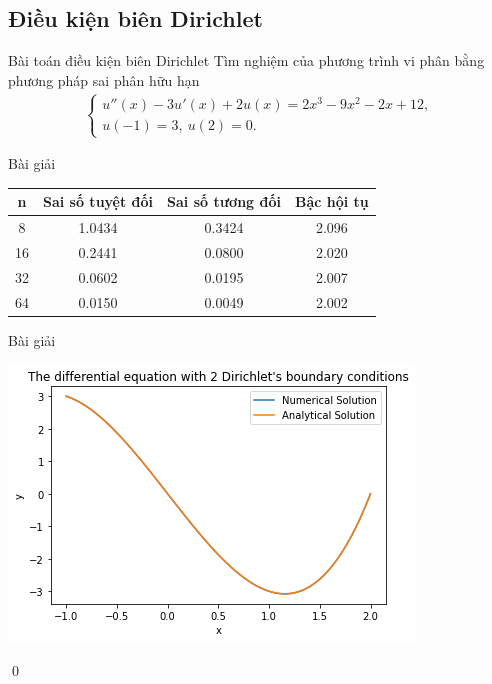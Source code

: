 \documentclass[9pt]{beamer}
\numberwithin{equation}{section}
\begin{document}
\subsection{Điều kiện biên Dirichlet}

\begin{frame}
\begin{block}{Bài toán điều kiện biên Dirichlet}
    Tìm nghiệm của phương trình vi phân bằng phương pháp sai phân hữu hạn
    \begin{align*}
    \begin{cases}
        u''(x) - 3u'(x) + 2u(x) = 2x^3 - 9x^2 - 2x + 12, \\
        u(-1) = 3, \ u(2) = 0.
    \end{cases}
    \end{align*}
\end{block}
    
\begin{exampleblock}{Bài giải}
    \begin{center}\begin{tabular}{||c|c|c|c||}
    \hline
    n & Sai số tuyệt đối & Sai số tương đối & Bậc hội tụ \\
    \hline\hline
    8   & 1.0434 & 0.3424 & 2.096 \\
    16  & 0.2441 & 0.0800 & 2.020 \\
    32  & 0.0602 & 0.0195 & 2.007 \\
    64  & 0.0150 & 0.0049 & 2.002 \\
    \hline
    \end{tabular}\end{center}
\end{exampleblock}
\end{frame}

\begin{frame}
\begin{exampleblock}{Bài giải}
    \begin{center}
        \includegraphics[scale=0.5]{img/midterm1}
    \end{center}
    \qed
\end{exampleblock} 
\end{frame}
\end{document}
